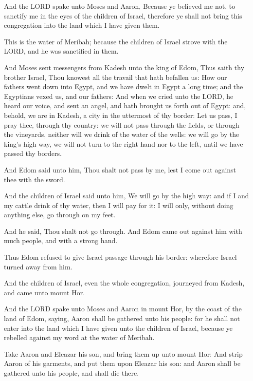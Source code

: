 \Verse And the LORD spake unto Moses and Aaron, Because ye believed me
not, to sanctify me in the eyes of the children of Israel, therefore
ye shall not bring this congregation into the land which I have given
them.

\Verse This is the water of Meribah; because the children of Israel
strove with the LORD, and he was sanctified in them.

\Verse And Moses sent messengers from Kadesh unto the king of Edom,
Thus saith thy brother Israel, Thou knowest all the travail that hath
befallen us: \Verse How our fathers went down into Egypt, and we have
dwelt in Egypt a long time; and the Egyptians vexed us, and our
fathers: \Verse And when we cried unto the LORD, he heard our voice,
and sent an angel, and hath brought us forth out of Egypt: and,
behold, we are in Kadesh, a city in the uttermost of thy border: \Verse
Let us pass, I pray thee, through thy country: we will not pass
through the fields, or through the vineyards, neither will we drink of
the water of the wells: we will go by the king's high way, we will not
turn to the right hand nor to the left, until we have passed thy
borders.

\Verse And Edom said unto him, Thou shalt not pass by me, lest I come
out against thee with the sword.

\Verse And the children of Israel said unto him, We will go by the high
way: and if I and my cattle drink of thy water, then I will pay for
it: I will only, without doing anything else, go through on my feet.

\Verse And he said, Thou shalt not go through. And Edom came out
against him with much people, and with a strong hand.

\Verse Thus Edom refused to give Israel passage through his border:
wherefore Israel turned away from him.

\Verse And the children of Israel, even the whole congregation,
journeyed from Kadesh, and came unto mount Hor.

\Verse And the LORD spake unto Moses and Aaron in mount Hor, by the
coast of the land of Edom, saying, \Verse Aaron shall be gathered unto
his people: for he shall not enter into the land which I have given
unto the children of Israel, because ye rebelled against my word at
the water of Meribah.

\Verse Take Aaron and Eleazar his son, and bring them up unto mount
Hor: \Verse And strip Aaron of his garments, and put them upon Eleazar
his son: and Aaron shall be gathered unto his people, and shall die
there.

